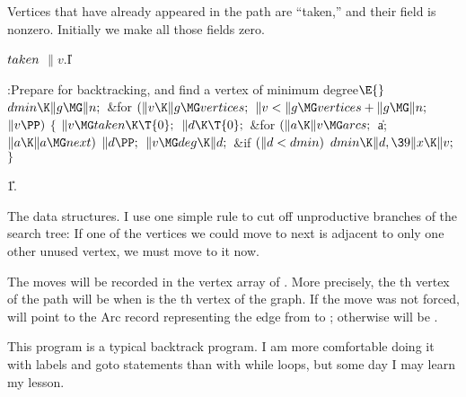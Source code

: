 Vertices that have already appeared in the path are ``taken,'' and
their  field is nonzero. Initially we make all those fields zero.

\Y\B\4\D$\\{taken}$ \5
$\|v.{}$\|I\par
\Y\B\4:Prepare  for backtracking, and find a vertex  of
minimum degree\X${}\E{}$\6
$\\{dmin}\K\|g\MG\|n;{}$\6
\&{for} ${}(\|v\K\|g\MG\\{vertices};{}$ ${}\|v<\|g\MG\\{vertices}+\|g\MG\|n;{}$
${}\|v\PP){}$\5
${}\{{}$\1\6
${}\|v\MG\\{taken}\K\T{0};{}$\6
${}\|d\K\T{0};{}$\6
\&{for} ${}(\|a\K\|v\MG\\{arcs};{}$ \|a; ${}\|a\K\|a\MG\\{next}){}$\1\5
${}\|d\PP;{}$\2\6
${}\|v\MG\\{deg}\K\|d;{}$\6
\&{if} ${}(\|d<\\{dmin}){}$\1\5
${}\\{dmin}\K\|d,\39\|x\K\|v;{}$\2\6
\4${}\}{}$\2\par
\U1.\fi

The data structures. I use one simple rule to cut off unproductive
branches of the search tree: If one of the vertices we could move to next
is adjacent to only one other unused vertex, we must move to it now.

The moves will be recorded in the vertex array of . More precisely, the
th vertex of the path will be  when  is
the th vertex of
the graph. If the move was not forced,  will point to the
Arc
record representing the edge from  to ; otherwise
 will be \PB{$\NULL$}.

This program is a typical backtrack program. I am more comfortable doing
it with labels and goto statements than with while loops, but some day
I may learn my lesson.

